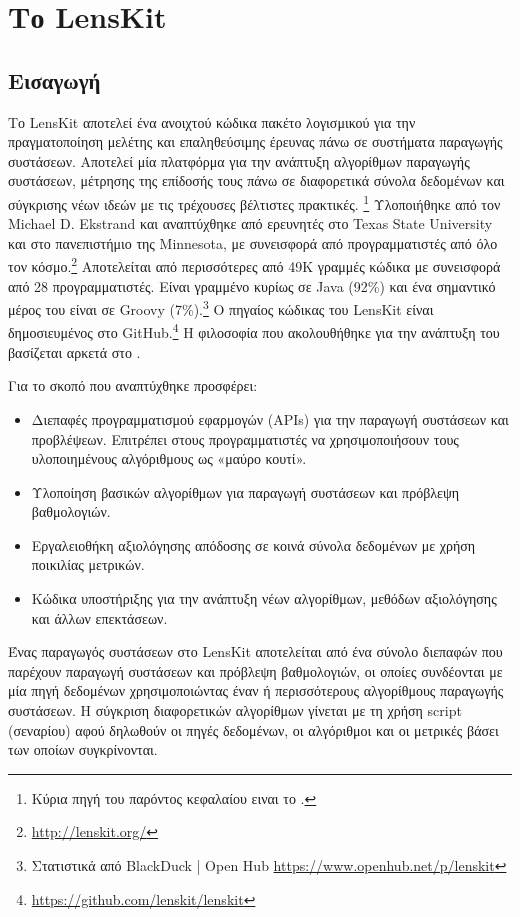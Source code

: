 \chapter{Το {\en LensKit}}
\label{Chapter4}

\section{Εισαγωγή}

Το {\en LensKit} \cite{Ekstrand:2011:RRR:2043932.2043958} αποτελεί ένα ανοιχτού κώδικα πακέτο λογισμικού για την πραγματοποίηση μελέτης και επαληθεύσιμης έρευνας πάνω σε συστήματα παραγωγής συστάσεων. Αποτελεί μία πλατφόρμα για την ανάπτυξη αλγορίθμων παραγωγής συστάσεων, μέτρησης της επίδοσής τους πάνω σε διαφορετικά σύνολα δεδομένων και σύγκρισης νέων ιδεών με τις τρέχουσες βέλτιστες πρακτικές. \cite{ekstrand_towards_2014}\footnote{Κύρια πηγή του παρόντος κεφαλαίου ειναι το \cite{ekstrand_towards_2014}.} Υλοποιήθηκε από τον {\en Michael D. Ekstrand} και αναπτύχθηκε από ερευνητές στο {\en Texas State University} και στο πανεπιστήμιο της {\en Minnesota}, με συνεισφορά από προγραμματιστές από όλο τον κόσμο.\footnote{\en \url{http://lenskit.org/}} Αποτελείται από περισσότερες από 49Κ γραμμές κώδικα με συνεισφορά από 28 προγραμματιστές. Είναι γραμμένο κυρίως σε {\en Java} (92\%) και ένα σημαντικό μέρος του είναι σε {\en Groovy} (7\%).\footnote{Στατιστικά από \en BlackDuck | Open Hub \url{https://www.openhub.net/p/lenskit}} Ο πηγαίος κώδικας του {\en LensKit} είναι δημοσιευμένος στο {\en GitHub}.\footnote{\en \url{https://github.com/lenskit/lenskit}} Η φιλοσοφία που ακολουθήθηκε για την ανάπτυξη του βασίζεται αρκετά στο \cite{Bloch:2008:EJ:1377533}.\par 
Για το σκοπό που αναπτύχθηκε προσφέρει:
\begin{itemize}
 \item Διεπαφές προγραμματισμού εφαρμογών ({\en APIs}) για την παραγωγή συστάσεων και προβλέψεων. Επιτρέπει στους προγραμματιστές να χρησιμοποιήσουν τους υλοποιημένους αλγόριθμους ως «μαύρο κουτί».
 \item Υλοποίηση βασικών αλγορίθμων για παραγωγή συστάσεων και πρόβλεψη βαθμολογιών. 
 \item Εργαλειοθήκη αξιολόγησης απόδοσης σε κοινά σύνολα δεδομένων με χρήση ποικιλίας μετρικών.
 \item Κώδικα υποστήριξης για την ανάπτυξη νέων αλγορίθμων, μεθόδων αξιολόγησης και άλλων επεκτάσεων.
\end{itemize}
\par Ένας παραγωγός συστάσεων στο {\en LensKit} αποτελείται από ένα σύνολο διεπαφών που παρέχουν παραγωγή συστάσεων και πρόβλεψη βαθμολογιών, οι οποίες συνδέονται με μία πηγή δεδομένων χρησιμοποιώντας έναν ή περισσότερους αλγορίθμους παραγωγής συστάσεων. Η σύγκριση διαφορετικών αλγορίθμων γίνεται με τη χρήση {\en script} (σεναρίου) αφού δηλωθούν οι πηγές δεδομένων, οι αλγόριθμοι και οι μετρικές βάσει των οποίων συγκρίνονται.
